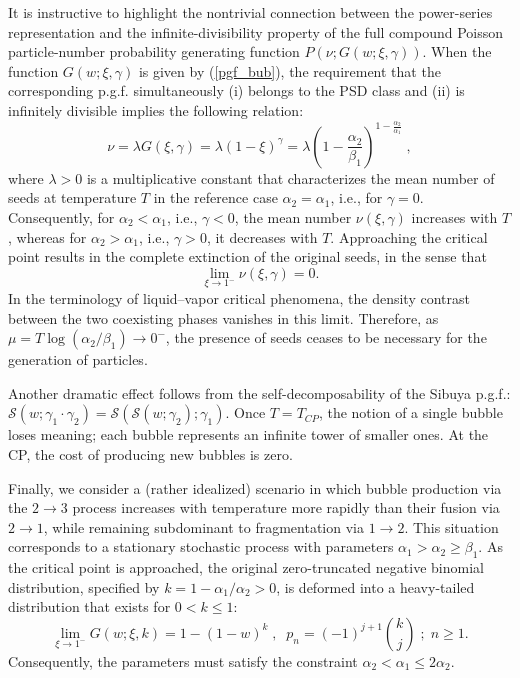\documentclass[a4paper,12pt]{amsart}
\theoremstyle{definition}
\theoremstyle{remark}
\begin{document}
 It is instructive to highlight the nontrivial connection between the power-series representation and the infinite-divisibility property of the full compound Poisson particle-number probability generating function  $P(\nu;G(w; \xi,\gamma))$. When the function $G(w;\xi,\gamma)$ is given by (\ref{pgf_bub}), the requirement that the corresponding p.g.f. simultaneously (i) belongs to the PSD class and (ii) is infinitely divisible implies the following relation:
\begin{equation}\label{part_bub}
\nu=\lambda G(\xi,\gamma)= 
\lambda\left (1-\xi\right)^{\gamma}=
\lambda\left (1-\frac{\alpha_2}{\beta_1}\right)^{1-\frac{\alpha_2}{\alpha_1}}
\;,
\end{equation}
where \(\lambda>0\) is a multiplicative constant that characterizes the mean number of seeds at temperature \(T\) in the reference case \(\alpha_2=\alpha_1\), i.e., for \(\gamma=0\).
Consequently, for $\alpha_2<\alpha_1$, i.e., $\gamma<0$, the mean number $\nu(\xi,\gamma)$ increases with $T$, whereas for $\alpha_2>\alpha_1$, i.e., $\gamma>0$, it decreases with $T$. Approaching the critical point results in the complete extinction of the original seeds, in the sense that
\[
\lim_{\xi\to 1^{-}}\nu(\xi,\gamma) = 0.
\]
In the terminology of liquid–vapor critical phenomena, the density contrast between the two coexisting phases vanishes in this limit. Therefore, as $\mu = T \log (\alpha_2/\beta_1)\to 0^{-}$, the presence of seeds ceases to be necessary for the generation of particles.

Another dramatic effect follows from the self-decomposability of the Sibuya p.g.f.: $\mathcal{S}(w;\gamma_1 \cdot \gamma_2) = \mathcal{S}(\mathcal{S}(w;\gamma_2);\gamma_1)$. Once $T=T_{CP}$, the notion of a single bubble loses meaning; each bubble represents an infinite tower of smaller ones. At the CP, the cost of producing new bubbles is zero.


Finally, we consider a (rather idealized) scenario in which bubble production via the $2\to 3$ process increases with temperature more rapidly than their fusion via $2\to 1$, while remaining subdominant to fragmentation via $1\to 2$. This situation corresponds to a stationary stochastic process with parameters $\alpha_1>\alpha_2\geq \beta_1$. As the critical point is approached, the original zero-truncated negative binomial distribution, specified by $k=1 -\alpha_1/\alpha_2>0$, is deformed into a heavy-tailed distribution that exists for $0<k\leq 1$: 
\begin{equation}\label{ztrNBD_lim}
\lim_{\xi\to 1^{-}}G(w; \xi, k)=1-(1-w)^k\;,\;\; p_n=(-1)^{j+1} \binom{k}{j}\;;\; n\geq 1.
\end{equation}
Consequently, the parameters must satisfy the constraint $\alpha_2<\alpha_1\leq 2\alpha_2$.
\end{document}
